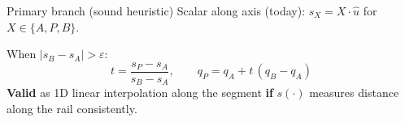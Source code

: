 \documentclass[aspectratio=169,10pt]{beamer}
\begin{document}
\begin{frame}{Primary branch (sound heuristic)}
\vspace{10mm}
Scalar along axis (today): $s_X=X\cdot\hat{u}$ for $X\in\{A,P,B\}$.

\smallskip
When $|s_B-s_A|>\varepsilon$:
\[
 t=\frac{s_P-s_A}{s_B-s_A},
 \qquad q_P=q_A+t\,(q_B-q_A)
\]
\textbf{Valid} as 1D linear interpolation along the segment \textbf{if} $s(\cdot)$ measures distance along the rail consistently.
\vfill
\end{frame}
\end{document}
